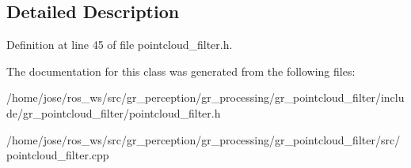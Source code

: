 \subsection{Detailed Description}


Definition at line 45 of file pointcloud\+\_\+filter.\+h.



The documentation for this class was generated from the following files\+:\begin{DoxyCompactItemize}
\item 
/home/jose/ros\+\_\+ws/src/gr\+\_\+perception/gr\+\_\+processing/gr\+\_\+pointcloud\+\_\+filter/include/gr\+\_\+pointcloud\+\_\+filter/pointcloud\+\_\+filter.\+h\item 
/home/jose/ros\+\_\+ws/src/gr\+\_\+perception/gr\+\_\+processing/gr\+\_\+pointcloud\+\_\+filter/src/pointcloud\+\_\+filter.\+cpp\end{DoxyCompactItemize}
